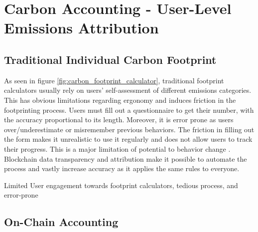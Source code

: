 \documentclass[11pt]{report}
\begin{document}
\section{Carbon Accounting - User-Level Emissions Attribution}



\subsection{Traditional Individual Carbon Footprint \label{se:traditional_footprint}}

As seen in figure \ref{fig:carbon_footprint_calculator}, traditional footprint calculators usually rely on users' self-assessment of different emissions categories. This has obvious limitations regarding ergonomy and induces friction in the footprinting process. Users must fill out a questionnaire to get their number, with the accuracy proportional to its length. Moreover, it is error prone as users over/underestimate or misremember previous behaviors. The friction in filling out the form makes it unrealistic to use it regularly and does not allow users to track their progress. This is a major limitation of potential to behavior change \cite{mulrowStateCarbonFootprint2019}. Blockchain data transparency and attribution make it possible to automate the process and vastly increase accuracy as it applies the same rules to everyone.



Limited User engagement towards footprint calculators, tedious process, and error-prone

\subsection{On-Chain Accounting \label{se:onchain-accounting}}
\end{document}
